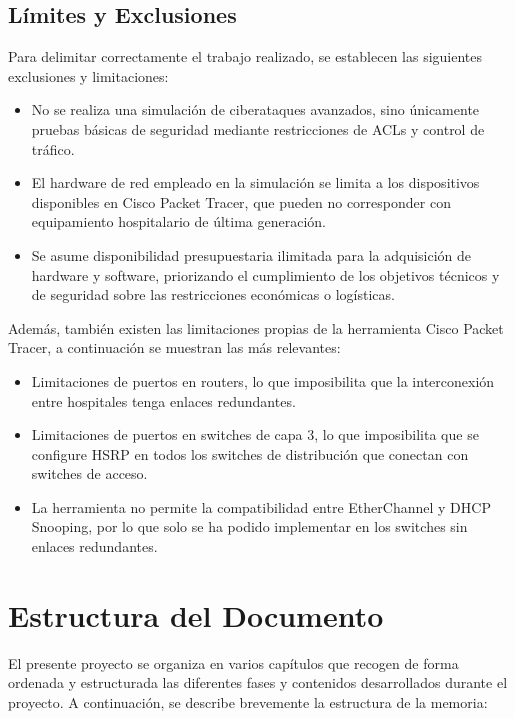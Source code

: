 \subsection{Límites y Exclusiones}
\label{subsec:limites}
Para delimitar correctamente el trabajo realizado, se establecen las siguientes exclusiones y limitaciones:
\begin{itemize}
    \item No se realiza una simulación de ciberataques avanzados, sino únicamente pruebas básicas de seguridad mediante restricciones de ACLs y control de tráfico.
    \item El hardware de red empleado en la simulación se limita a los dispositivos disponibles en Cisco Packet Tracer, que pueden no corresponder con equipamiento 
    hospitalario de última generación.
    \item Se asume disponibilidad presupuestaria ilimitada para la adquisición de hardware y software, priorizando el cumplimiento de los objetivos técnicos y de 
    seguridad sobre las restricciones económicas o logísticas.
\end{itemize}
Además, también existen las limitaciones propias de la herramienta Cisco Packet Tracer, a continuación se muestran las más relevantes:
\begin{itemize}
    \item Limitaciones de puertos en routers, lo que imposibilita que la interconexión entre hospitales tenga enlaces redundantes.
    \item Limitaciones de puertos en switches de capa 3, lo que imposibilita que se configure HSRP en todos los switches de distribución que conectan con switches de acceso.
    \item La herramienta no permite la compatibilidad entre EtherChannel y DHCP Snooping, por lo que solo se ha podido implementar en los switches sin enlaces redundantes.
\end{itemize}

\section{Estructura del Documento}
El presente proyecto se organiza en varios capítulos que recogen de forma ordenada y estructurada las diferentes fases y contenidos desarrollados durante el proyecto. 
A continuación, se describe brevemente la estructura de la memoria:

